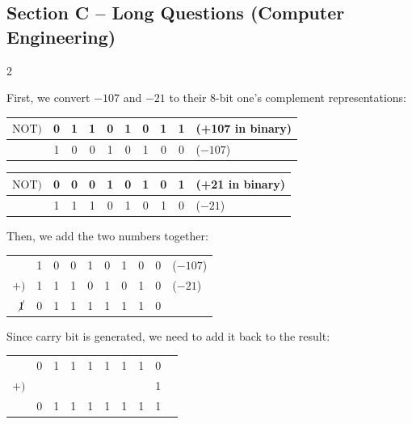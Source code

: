 \subsection*{Section C -- Long Questions (Computer Engineering)}
\begin{multicols}{2}

\begin{solution}
    First, we convert $-107$ and $-21$ to their 8-bit one's complement representations:
    \begin{center}
        \begin{tabular}{rccccccccl}
            $\mathrm{NOT})$  & 0 & 1 & 1 & 0 & 1 & 0 & 1 & 1 & (+107 in binary)\\\hline
                             & 1 & 0 & 0 & 1 & 0 & 1 & 0 & 0 & ($-107$)\\
        \end{tabular}
    \end{center}
    \begin{center}
        \begin{tabular}{rccccccccl}
            $\mathrm{NOT})$  & 0 & 0 & 0 & 1 & 0 & 1 & 0 & 1 & (+21 in binary)\\\hline
                             & 1 & 1 & 1 & 0 & 1 & 0 & 1 & 0 & ($-21$)\\
        \end{tabular}
    \end{center}

    Then, we add the two numbers together:
    \begin{center}
        \begin{tabular}{rccccccccl}
                             & 1 & 0 & 0 & 1 & 0 & 1 & 0 & 0 & ($-107$)\\
            $+)$             & 1 & 1 & 1 & 0 & 1 & 0 & 1 & 0 & ($-21$)\\\hline
                $\cancel{1}$ & 0 & 1 & 1 & 1 & 1 & 1 & 1 & 0 & \\
        \end{tabular}
    \end{center}

    Since carry bit is generated, we need to add it back to the result:
    \begin{center}
        \begin{tabular}{rccccccccl}
                             & 0 & 1 & 1 & 1 & 1 & 1 & 1 & 0 & \\
            $+)$             &   &   &   &   &   &   &   & 1 & \\\hline
                             & 0 & 1 & 1 & 1 & 1 & 1 & 1 & 1 & \\
        \end{tabular}
    \end{center}
    

\end{solution}
\end{multicols}
